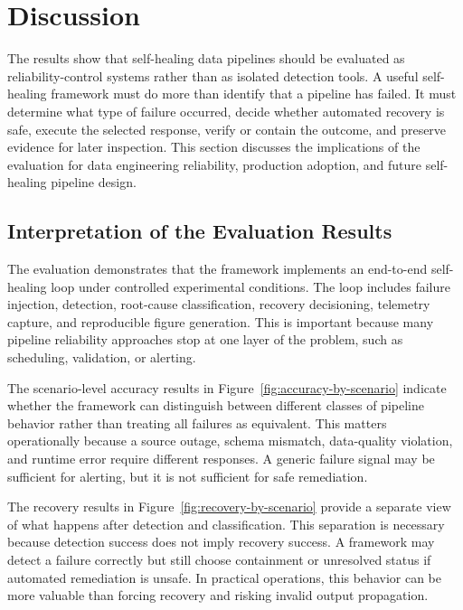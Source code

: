 \section{Discussion}
\label{sec:discussion}

The results show that self-healing data pipelines should be evaluated as reliability-control systems rather than as isolated detection tools. A useful self-healing framework must do more than identify that a pipeline has failed. It must determine what type of failure occurred, decide whether automated recovery is safe, execute the selected response, verify or contain the outcome, and preserve evidence for later inspection. This section discusses the implications of the evaluation for data engineering reliability, production adoption, and future self-healing pipeline design.

\subsection{Interpretation of the Evaluation Results}

The evaluation demonstrates that the framework implements an end-to-end self-healing loop under controlled experimental conditions. The loop includes failure injection, detection, root-cause classification, recovery decisioning, telemetry capture, and reproducible figure generation. This is important because many pipeline reliability approaches stop at one layer of the problem, such as scheduling, validation, or alerting.

The scenario-level accuracy results in Figure~\ref{fig:accuracy-by-scenario} indicate whether the framework can distinguish between different classes of pipeline behavior rather than treating all failures as equivalent. This matters operationally because a source outage, schema mismatch, data-quality violation, and runtime error require different responses. A generic failure signal may be sufficient for alerting, but it is not sufficient for safe remediation.

The recovery results in Figure~\ref{fig:recovery-by-scenario} provide a separate view of what happens after detection and classification. This separation is necessary because detection success does not imply recovery success. A framework may detect a failure correctly but still choose containment or unresolved status if automated remediation is unsafe. In practical operations, this behavior can be more valuable than forcing recovery and risking invalid output propagation.

